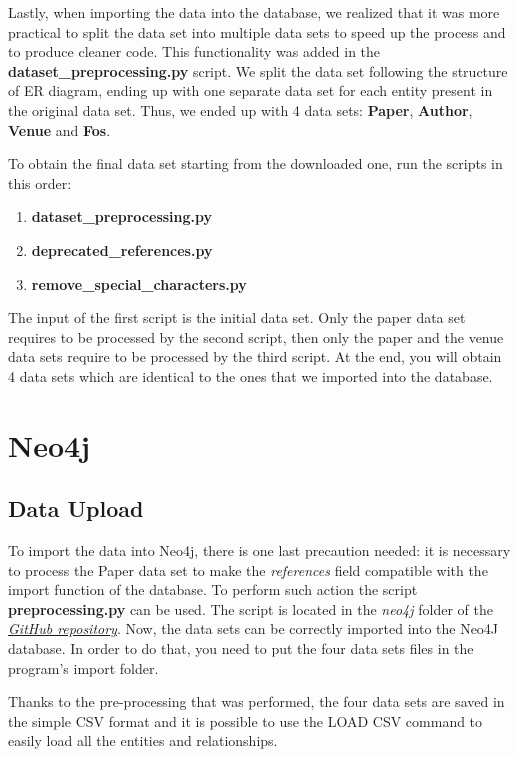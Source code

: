 \documentclass{Configuration_Files/PoliMi3i_thesis}
\begin{document}
Lastly, when importing the data into the database, we realized that it was more practical to split the data set into multiple data sets to speed up the process and to produce cleaner code.  This functionality was added in the \textbf{dataset\_preprocessing.py} script. We split the data set following the structure of ER diagram, ending up with one separate data set for each entity present in the original data set. Thus, we ended up with 4 data sets: \textbf{Paper}, \textbf{Author}, \textbf{Venue} and \textbf{Fos}.

To obtain the final data set starting from the downloaded one, run the scripts in this order:

\begin{enumerate}
    \item \textbf{dataset\_preprocessing.py}
    \item \textbf{deprecated\_references.py}
    \item \textbf{remove\_special\_characters.py}
\end{enumerate}

The input of the first script is the initial data set. Only the paper data set requires to be processed by the second script, then only the paper and the venue data sets require to be processed by the third script. 
At the end, you will obtain 4 data sets which are identical to the ones that we imported into the database.

\section{Neo4j}
\label{ch:neo}
\subsection{Data Upload}
To import the data into Neo4j, there is one last precaution needed: it is necessary to process the Paper data set to make the \textit{references} field compatible with the import function of the database. To perform such action the script \textbf{preprocessing.py} can be used. The script is located in the \textit{neo4j} folder of the \href{https://github.com/albertopirillo/smbud-project-2022}{\textit{GitHub repository}}.
Now, the data sets can be correctly imported into the Neo4J database. In order to do that, you need to put the four data sets files in the program's import folder. 

Thanks to the pre-processing that was performed, the four data sets are saved in the simple CSV format and it is possible to use the LOAD CSV command to easily load all the entities and relationships.
\end{document}
